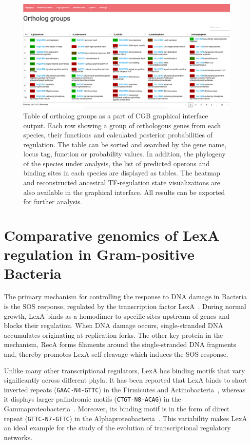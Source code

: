 \begin{figure}
  \centering
  \includegraphics[width=\textwidth]{figures/chapter4/output}
  \caption{Table of ortholog groups as a part of CGB graphical interface
    output. Each row showing a group of orthologous genes from each species,
    their functions and calculated posterior probabilities of regulation. The
    table can be sorted and searched by the gene name, locus tag, function or
    probability values. In addition, the phylogeny of the species under
    analysis, the list of predicted operons and binding sites in each species
    are displayed as tables. The heatmap and reconstructed ancestral
    TF-regulation state visualizations are also available in the graphical
    interface. All results can be exported for further analysis.}
  \label{fig:gui-output}
\end{figure}

\section{Comparative genomics of LexA regulation in Gram-positive Bacteria}

The primary mechanism for controlling the response to DNA damage in Bacteria is
the SOS response, regulated by the transcription factor
LexA~\cite{radman1975sos, erill2007aeons, michel2005after}. During normal
growth, LexA binds as a homodimer to specific sites upstream of genes and
blocks their regulation. When DNA damage occurs, single-stranded DNA
accumulates originating at replication forks. The other key protein in the
mechanism, RecA forms filaments around the single-stranded DNA fragments and,
thereby promotes LexA self-cleavage which induces the SOS response.

Unlike many other transcriptional regulators, LexA has binding motifs that vary
significantly across different phyla. It has been reported that LexA binds to
short inverted repeats (\texttt{GAAC-N4-GTTC}) in the Firmicutes and
Actinobacteria~\cite{au2005genetic, davis2002definition}, whereas it displays
larger palindromic motifs (\texttt{CTGT-N8-ACAG}) in the
Gammaproteobacteria~\cite{erill2003silico,
  fernandez2000identification}. Moreover, its binding motif is in the form of
direct repeat (\texttt{GTTC-N7-GTTC}) in the
Alphaproteobacteria~\cite{erill2004differences, fernandez1998identification}.
This variability makes LexA an ideal example for the study of the evolution
of transcriptional regulatory networks.


